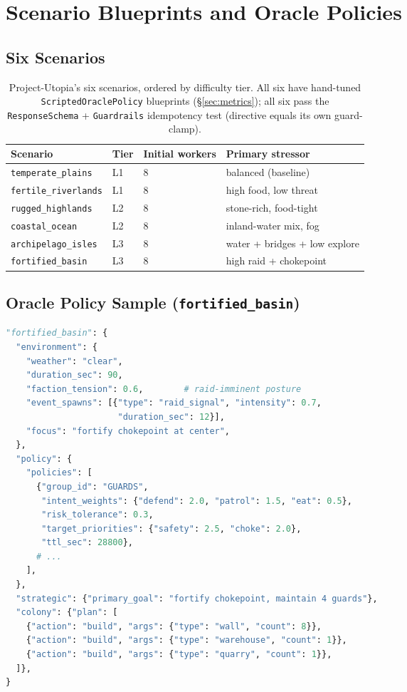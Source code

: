 \section{Scenario Blueprints and Oracle Policies}
\label{app:scenarios}

\subsection{Six Scenarios}

\begin{table}[h]
\centering
\small
\begin{tabular}{llll}
\toprule
Scenario & Tier & Initial workers & Primary stressor \\
\midrule
\texttt{temperate\_plains} & L1 & 8  & balanced (baseline) \\
\texttt{fertile\_riverlands} & L1 & 8  & high food, low threat \\
\texttt{rugged\_highlands} & L2 & 8  & stone-rich, food-tight \\
\texttt{coastal\_ocean} & L2 & 8  & inland-water mix, fog \\
\texttt{archipelago\_isles} & L3 & 8  & water + bridges + low explore \\
\texttt{fortified\_basin} & L3 & 8  & high raid + chokepoint \\
\bottomrule
\end{tabular}
\caption{Project-Utopia's six scenarios, ordered by difficulty
tier. All six have hand-tuned \texttt{ScriptedOraclePolicy}
blueprints (\S\ref{sec:metrics}); all six pass the
\texttt{ResponseSchema} + \texttt{Guardrails} idempotency test
(directive equals its own guard-clamp).}
\end{table}

\subsection{Oracle Policy Sample (\texttt{fortified\_basin})}

\begin{lstlisting}[caption={Excerpt from scripted\_oracle\_policy.py},language=Python]
"fortified_basin": {
  "environment": {
    "weather": "clear",
    "duration_sec": 90,
    "faction_tension": 0.6,        # raid-imminent posture
    "event_spawns": [{"type": "raid_signal", "intensity": 0.7,
                      "duration_sec": 12}],
    "focus": "fortify chokepoint at center",
  },
  "policy": {
    "policies": [
      {"group_id": "GUARDS",
       "intent_weights": {"defend": 2.0, "patrol": 1.5, "eat": 0.5},
       "risk_tolerance": 0.3,
       "target_priorities": {"safety": 2.5, "choke": 2.0},
       "ttl_sec": 28800},
      # ...
    ],
  },
  "strategic": {"primary_goal": "fortify chokepoint, maintain 4 guards"},
  "colony": {"plan": [
    {"action": "build", "args": {"type": "wall", "count": 8}},
    {"action": "build", "args": {"type": "warehouse", "count": 1}},
    {"action": "build", "args": {"type": "quarry", "count": 1}},
  ]},
}
\end{lstlisting}

